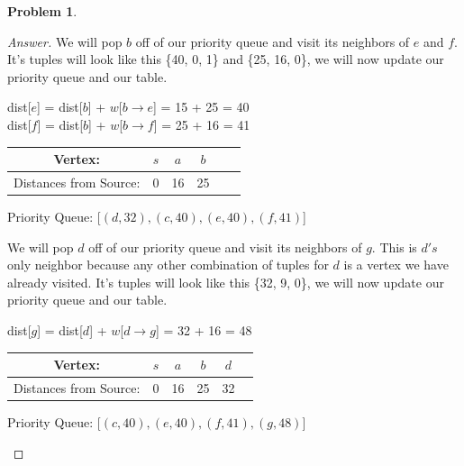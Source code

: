 \documentclass[11pt]{article}
\theoremstyle{definition}
\theoremstyle{definition}
\newtheorem{required}{Problem}
\theoremstyle{definition}
\begin{document}
\begin{required}
\begin{enumerate}[label=(\alph*)]
\begin{proof}[Answer]
We will pop $b$ off of our priority queue and visit its neighbors of $e$ and $f$. It's tuples will look like this \{40, 0, 1\} and \{25, 16, 0\}, we will now update our priority queue and our table.
\begin{center}
dist[$e$] = dist[$b$]  + $w$[$b \rightarrow e$] = 15 + 25 = 40 \\
dist[$f$] = dist[$b$] + $w$[$b \rightarrow f$] = 25 + 16 = 41\\
\begin{tabular}{ | c | c | c | c | c | c |}
 \hline
 Vertex:& $s$ & $a$ & $b$\\ 
 \hline
 Distances from Source:& 0 & 16 & 25\\  
 \hline
\end{tabular}
\end{center}
\begin{center}
Priority Queue: [$(d, 32), (c, 40), (e, 40), (f, 41)$]
\end{center}

We will pop $d$ off of our priority queue and visit its neighbors of $g$. This is $d's$ only neighbor because any other combination of tuples for $d$ is a vertex we have already visited. It's tuples will look like this \{32, 9, 0\}, we will now update our priority queue and our table.
\begin{center}
dist[$g$] = dist[$d$]  + $w$[$d \rightarrow g$] = 32 + 16 = 48 \\
\begin{tabular}{ | c | c | c | c | c | c |}
 \hline
 Vertex:& $s$ & $a$ & $b$ & $ d $\\ 
 \hline
 Distances from Source:& 0 & 16 & 25 & 32\\  
 \hline
\end{tabular}
\end{center}
\begin{center}
Priority Queue: [$(c, 40), (e, 40), (f, 41), (g, 48)$]
\end{center}


\end{proof}
\end{enumerate}
\end{required}
\end{document}
